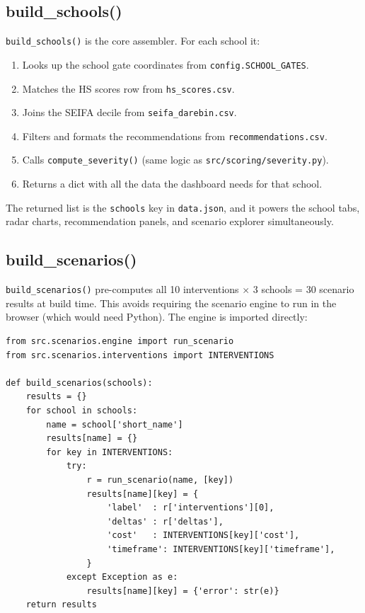 \documentclass[11pt,a4paper,openany]{book}
\begin{document}
\subsection{build\_schools()}

\texttt{build\_schools()} is the core assembler.  For each school it:

\begin{enumerate}
  \item Looks up the school gate coordinates from \texttt{config.SCHOOL\_GATES}.
  \item Matches the HS scores row from \texttt{hs\_scores.csv}.
  \item Joins the SEIFA decile from \texttt{seifa\_darebin.csv}.
  \item Filters and formats the recommendations from \texttt{recommendations.csv}.
  \item Calls \texttt{compute\_severity()} (same logic as \texttt{src/scoring/severity.py}).
  \item Returns a dict with all the data the dashboard needs for that school.
\end{enumerate}

The returned list is the \texttt{schools} key in \texttt{data.json}, and it powers the
school tabs, radar charts, recommendation panels, and scenario explorer simultaneously.

\subsection{build\_scenarios()}

\texttt{build\_scenarios()} pre-computes all 10 interventions $\times$ 3 schools = 30
scenario results at build time.  This avoids requiring the scenario engine to run in
the browser (which would need Python).  The engine is imported directly:

\begin{lstlisting}[style=python, caption={Pre-computing scenarios during data build.}]
from src.scenarios.engine import run_scenario
from src.scenarios.interventions import INTERVENTIONS

def build_scenarios(schools):
    results = {}
    for school in schools:
        name = school['short_name']
        results[name] = {}
        for key in INTERVENTIONS:
            try:
                r = run_scenario(name, [key])
                results[name][key] = {
                    'label'  : r['interventions'][0],
                    'deltas' : r['deltas'],
                    'cost'   : INTERVENTIONS[key]['cost'],
                    'timeframe': INTERVENTIONS[key]['timeframe'],
                }
            except Exception as e:
                results[name][key] = {'error': str(e)}
    return results
\end{lstlisting}
\end{document}
